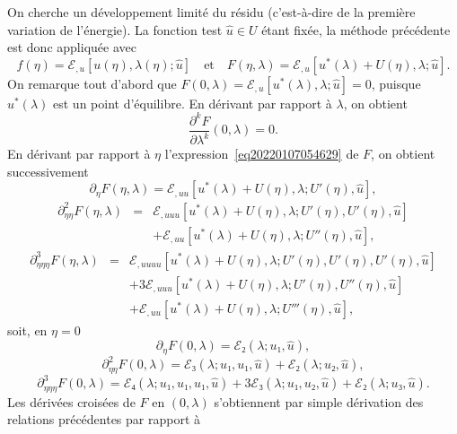 \documentclass[12pt, final]{amsart}
\theoremstyle{definition}
\begin{document}
On cherche un développement limité du résidu (c'est-à-dire de
la première variation de l'énergie). La fonction test $\hat{u}∈U$
étant fixée, la méthode précédente est donc appliquée
avec
\begin{equation}
  \label{eq20220107054629} f (η) =ℰ_{, u} [u (η), λ
  (η) ; \hat{u}] \quad \text{et} \quad F (η, λ) =ℰ_{, u}
  [u^{\ast} (λ) + U (η), λ ; \hat{u}] .
\end{equation}
On remarque tout d'abord que $F (0, λ) =ℰ_{, u} [u^{\ast}
(λ), λ ; \hat{u}] = 0$, puisque $u^{\ast} (λ)$ est un point
d'équilibre. En dérivant par rapport à $λ$, on obtient
\begin{equation}
  \label{eq20211112164240} \frac{\partial^k F}{\partial λ^k} (0,
  λ) = 0.
\end{equation}
En dérivant par rapport à $η$ l'expression~\eqref{eq20220107054629}
de $F$, on obtient successivement
\begin{equation}
  \partial_{η} F (η, λ) =ℰ_{, u  u} [u^{\ast}
  (λ) + U (η), λ ; U' (η), \hat{u}],
\end{equation}
\begin{eqnarray}
  \partial_{η  η}^2 F (η, λ) & = & ℰ_{, u
   u  u} [u^{\ast} (λ) + U (η), λ ; U' (η),
  U' (η), \hat{u}] \nonumber\\
  &  &  +ℰ_{, u  u} [u^{\ast} (λ) + U
  (η), λ ; U'' (η), \hat{u}],
\end{eqnarray}
\begin{eqnarray}
  \partial_{η  η  η}^3 F (η, λ) & = &
  ℰ_{, u  u  u  u} [u^{\ast} (λ) + U
  (η), λ ; U' (η), U' (η), U' (η), \hat{u}] \nonumber\\
  &  &  + 3ℰ_{, u  u  u} [u^{\ast}
  (λ) + U (η), λ ; U' (η), U'' (η), \hat{u}] \nonumber\\
  &  &  +ℰ_{, u  u} [u^{\ast} (λ) + U
  (η), λ ; U''' (η), \hat{u}],
\end{eqnarray}
soit, en $η = 0$
\begin{equation}
  \partial_{η} F (0, λ) =ℰ₂ (λ ; u₁, \hat{u}),
\end{equation}
\begin{equation}
  \partial_{η  η}^2 F (0, λ) =ℰ₃ (λ ;
  u₁, u₁, \hat{u}) +ℰ₂ (λ ; u₂, \hat{u}),
\end{equation}
\begin{equation}
  \partial_{η  η  η}^3 F (0, λ) =ℰ₄
  (λ ; u₁, u₁, u₁, \hat{u}) + 3ℰ₃ (λ ; u₁, u₂,
  \hat{u}) +ℰ₂ (λ ; u₃, \hat{u}) .
\end{equation}
Les dérivées croisées de $F$ en $(0, λ)$ s'obtiennent par
simple dérivation des relations précédentes par rapport à
\end{document}
